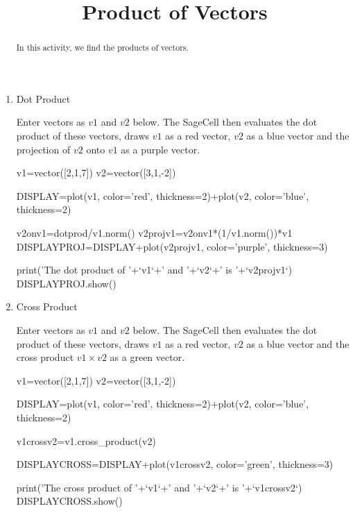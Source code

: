 \documentclass{ximera}
\title{Product of Vectors}
\begin{document}
      
\begin{abstract}
      
In this activity, we find the products of vectors.
      
\end{abstract}
      
\maketitle
      

\begin{enumerate}
\item Dot Product

Enter  vectors as $v1$ and $v2$ below.  The SageCell then evaluates the dot product of these vectors, draws $v1$ as a red vector, $v2$ as a blue vector and  the projection of $v2$ onto $v1$ as a purple vector.

\begin{sageCell}
v1=vector([2,1,7])
v2=vector([3,1,-2])

DISPLAY=plot(v1, color='red', thickness=2)+plot(v2, color='blue', thickness=2)

v2onv1=dotprod/v1.norm()
v2projv1=v2onv1*(1/v1.norm())*v1
DISPLAYPROJ=DISPLAY+plot(v2projv1, color='purple', thickness=3)

print('The dot product of '+`v1`+' and '+`v2`+' is '+`v2projv1`)
DISPLAYPROJ.show()
\end{sageCell}


\item Cross Product

Enter  vectors as $v1$ and $v2$ below.  The SageCell then evaluates the dot product of these vectors, draws $v1$ as a red vector, $v2$ as a blue vector and  the cross product $v1\times v2$ as a green vector.


\begin{sageCell}
v1=vector([2,1,7])
v2=vector([3,1,-2])

DISPLAY=plot(v1, color='red', thickness=2)+plot(v2, color='blue', thickness=2)

v1crossv2=v1.cross_product(v2)

DISPLAYCROSS=DISPLAY+plot(v1crossv2, color='green', thickness=3)

print('The cross product of '+`v1`+' and '+`v2`+' is '+`v1crossv2`)
DISPLAYCROSS.show()
\end{sageCell}




\end{enumerate}


 
 
 
 
      
\end{document}
